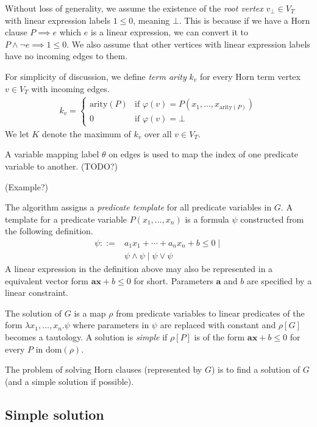 \documentclass[a4paper,12pt]{article}
\begin{document}
Without loss of generality, we assume the existence of the \emph{root
  vertex} $v_\bot \in V_T$ with linear expression labels $1 \leq 0$,
meaning $\bot$.  This is because if we have a Horn clause $P \implies
e$ which $e$ is a linear expression, we can convert it to $P \wedge
\neg e \implies 1 \leq 0$.  We also assume that other vertices with
linear expression labels have no incoming edges to them.

For simplicity of discussion, we define \emph{term arity} $k_v$ for
every Horn term vertex $v \in V_T$ with incoming edges.
\begin{align*}
k_v =
\begin{cases}
\mathrm{arity}(P) & \mbox{if } \varphi(v) = P(x_1,...,x_{\mathrm{arity}(P)}) \\
0 & \mbox{if } \varphi(v) = \bot
\end{cases}
\end{align*}
We let $K$ denote the maximum of $k_v$ over all $v \in V_T$.

A variable mapping label $\theta$ on edges is used to map the index of
one predicate variable to another. (TODO?)

(Example?)

The algorithm assigns a \emph{predicate template} for all predicate
variables in $G$. A template for a predicate variable $P(x_1, \ldots, x_n)$
is a formula $\psi$ constructed from the following definition.
\begin{align*}
\psi ::= & a_1 x_1 + \cdots + a_n x_n + b \leq 0 \mid \\
& \psi \wedge \psi \mid \psi \vee \psi
\end{align*}
A linear expression in the definition above may also be represented in
a equivalent vector form $\mathbf{a} \mathbf{x} + b \leq 0$ for short.
Parameters $\mathbf{a}$ and $b$ are specified by a linear constraint.

The solution of $G$ is a map $\rho$ from predicate variables to linear
predicates of the form $\lambda x_1, \ldots ,x_n. \psi$ where
parameters in $\psi$ are replaced with constant and $\rho[G]$ becomes
a tautology.  A solution is \textit{simple} if $\rho[P]$ is of the
form $\mathbf{a} \mathbf{x} + b \leq 0$ for every $P$ in
$\mathrm{dom}(\rho)$.

The problem of solving Horn clauses (represented by $G$) is to find a
solution of $G$ (and a simple solution if possible).

\subsection{Simple solution}
\end{document}
